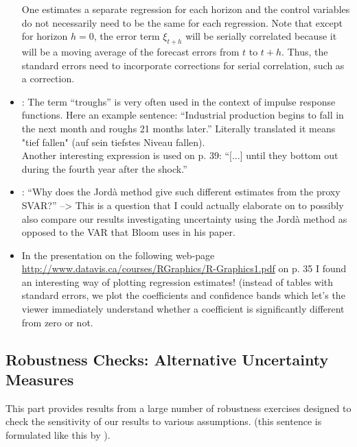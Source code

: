 \documentclass[a4paper,12pt,oneside,pointednumbers,bibtotoc,bigheadings,liststotoc]{scrbook}
\begin{document}
\begin{itemize}
	One estimates a separate regression for each horizon and the control variables do not necessarily need to be the same for each regression. Note that except for horizon $h=0$, the error term $\xi_{t+h}$ will be serially correlated because it will be a moving average of the forecast errors from $t$ to $t+h$. Thus, the standard errors need to incorporate corrections for serial correlation, such as a \citep{newest:87} correction.
	\item \citet[p. 37]{ramey:16}: The term ``troughs'' is very often used in the context of impulse response functions. Here an example sentence: ``Industrial production begins to fall in the next month and roughs 21 months later.'' Literally translated it means "tief fallen" (auf sein tiefstes Niveau fallen).\\
	Another interesting expression is used on p. 39: ``[...] until they bottom out during the fourth year after the shock.''
	\item \citet[p. 45]{ramey:16}: ``Why does the Jordà method give such different estimates from the proxy SVAR?'' --> This is a question that I could actually elaborate on to possibly also compare our results investigating uncertainty using the Jordà method as opposed to the VAR that Bloom uses in his paper.
	\item In the presentation on the following web-page \url{http://www.datavis.ca/courses/RGraphics/R-Graphics1.pdf} on p. 35 I found an interesting way of plotting regression estimates! (instead of tables with standard errors, we plot the coefficients and confidence bands which let's the viewer immediately understand whether a coefficient is significantly different from zero or not.
\end{itemize}
\endgroup




\subsection{Robustness Checks: Alternative Uncertainty Measures}
This part provides results from a large number of robustness exercises designed to check the sensitivity of our results to various assumptions. (this sentence is formulated like this by \citet{juradoetal:15}).
\end{document}
